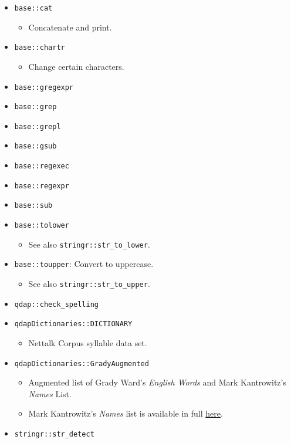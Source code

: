 \documentclass[
]{book}
\providecommand{\tightlist}{%
  \setlength{\itemsep}{0pt}\setlength{\parskip}{0pt}}
\begin{document}
\begin{itemize}
\tightlist
\item
  \texttt{base::cat}

  \begin{itemize}
  \tightlist
  \item
    Concatenate and print.
  \end{itemize}
\item
  \texttt{base::chartr}

  \begin{itemize}
  \tightlist
  \item
    Change certain characters.
  \end{itemize}
\item
  \texttt{base::gregexpr}
\item
  \texttt{base::grep}
\item
  \texttt{base::grepl}
\item
  \texttt{base::gsub}
\item
  \texttt{base::regexec}
\item
  \texttt{base::regexpr}
\item
  \texttt{base::sub}
\item
  \texttt{base::tolower}

  \begin{itemize}
  \tightlist
  \item
    See also \texttt{stringr::str\_to\_lower}.
  \end{itemize}
\item
  \texttt{base::toupper}: Convert to uppercase.

  \begin{itemize}
  \tightlist
  \item
    See also \texttt{stringr::str\_to\_upper}.
  \end{itemize}
\item
  \texttt{qdap::check\_spelling}
\item
  \texttt{qdapDictionaries::DICTIONARY}

  \begin{itemize}
  \tightlist
  \item
    Nettalk Corpus syllable data set.
  \end{itemize}
\item
  \texttt{qdapDictionaries::GradyAugmented}

  \begin{itemize}
  \tightlist
  \item
    Augmented list of Grady Ward's \emph{English Words} and Mark Kantrowitz's \emph{Names} List.
  \item
    Mark Kantrowitz's \emph{Names} list is available in full \href{http://www.cs.cmu.edu/afs/cs/project/ai-repository/ai/areas/nlp/corpora/names/}{here}.
  \end{itemize}
\item
  \texttt{stringr::str\_detect}


\end{itemize}
\end{document}
